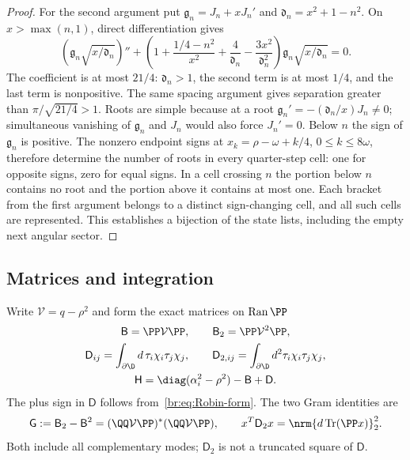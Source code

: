 \begin{proof}
For the second argument put $\mathfrak g_n=J_n+xJ_n'$ and
$\mathfrak d_n=x^2+1-n^2$. On $x>\max(n,1)$, direct differentiation gives
\begin{equation}\label{br:eq:Robin-ode}
 \left(\mathfrak g_n\sqrt{x/\mathfrak d_n}\right)''+
 \left(1+\frac{1/4-n^2}{x^2}+\frac4{\mathfrak d_n}
              -\frac{3x^2}{\mathfrak d_n^2}\right)
 \mathfrak g_n\sqrt{x/\mathfrak d_n}=0.
\end{equation}
The coefficient is at most $21/4$: $\mathfrak d_n>1$, the second term
is at most $1/4$, and the last term is nonpositive. The same spacing
argument gives separation greater than $\pi/\sqrt{21/4}>1$.
Roots are simple because at a root
$\mathfrak g_n'=-(\mathfrak d_n/x)J_n\ne0$; simultaneous vanishing of $\mathfrak g_n$ and
$J_n$ would also force $J_n'=0$. Below $n$ the sign of $\mathfrak g_n$ is positive.
The nonzero endpoint signs at
$x_k=\rho-\omega+k/4$, $0\le k\le8\omega$, therefore determine the number
of roots in every quarter-step cell: one for opposite signs, zero for
equal signs. In a cell crossing $n$ the portion below $n$ contains no
root and the portion above it contains at most one. Each bracket from
the first argument belongs to a distinct sign-changing cell, and all
such cells are represented. This establishes a bijection of the state
lists, including the empty next angular sector.
\end{proof}

\subsection{Matrices and integration}\label{br:sec:matrices}
Write $\mathcal V=q-\rho^2$ and form the exact matrices on $\operatorname{Ran}\PP$
\begin{equation}\label{br:eq:matrices}
 \begin{gathered}
 \mathsf B=\PP\mathcal V\PP,\qquad
 \mathsf B_2=\PP\mathcal V^2\PP,\\
 \mathsf D_{ij}=\int_{\partial\D}d\,\tau_i\chi_i \tau_j\chi_j,
 \qquad \mathsf D_{2,ij}=\int_{\partial\D}d^2\tau_i\chi_i \tau_j\chi_j,\\
 \mathsf H=\diag(\alpha_i^2-\rho^2)-\mathsf B+\mathsf D.
 \end{gathered}
\end{equation}
The plus sign in $\mathsf D$ follows from~\eqref{br:eq:Robin-form}.
The two Gram identities are
\begin{equation}\label{br:eq:grams}
 \mathsf G:=\mathsf B_2-\mathsf B^2
 = (\QQ\mathcal V\PP)^*(\QQ\mathcal V\PP),\qquad
 x^T\mathsf D_2x=\nrm{d\operatorname{Tr}(\PP x)}_2^2.
\end{equation}
Both include all complementary modes; $\mathsf D_2$ is not a truncated
square of $\mathsf D$.

